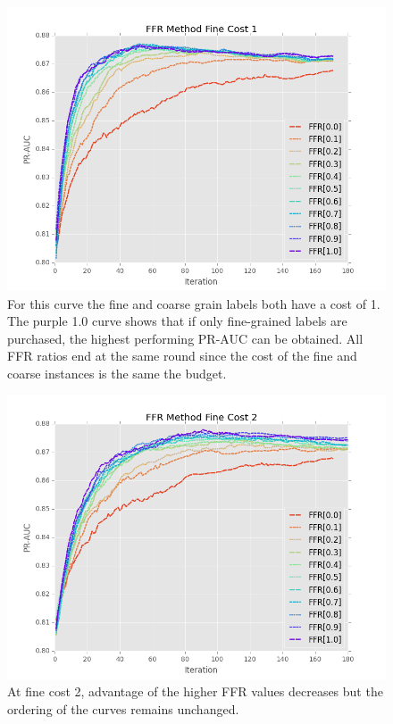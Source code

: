 \documentclass[ms]{nuthesis}
\begin{document}
\FloatBarrier
\begin{figure}[!htb]
	\centering
    \includegraphics[width=1.0\columnwidth]{fig/ParamsFFR_PR_Cost1_rnds0_180}
    \caption{For this curve the fine and coarse grain labels
    both have a cost of 1. The purple 1.0 curve shows that if only fine-grained labels
    are purchased, the highest performing PR-AUC can be obtained. All FFR ratios end at the same round
    since the cost of the fine and coarse instances is the same the budget.}
    \label{fig:ParamsFFR_PR_Cost1_rnds0_180}
\end{figure}
\FloatBarrier


\FloatBarrier
\begin{figure}[!htb]
	\centering
    \includegraphics[width=1.0\columnwidth]{fig/ParamsFFR_PR_Cost2_rnds0_180}
    \caption{At fine cost 2, advantage of the higher FFR values decreases but the ordering
    of the curves remains unchanged.}
    \label{fig:ParamsFFR_PR_Cost2_rnds0_180}
\end{figure}
\FloatBarrier
\end{document}
